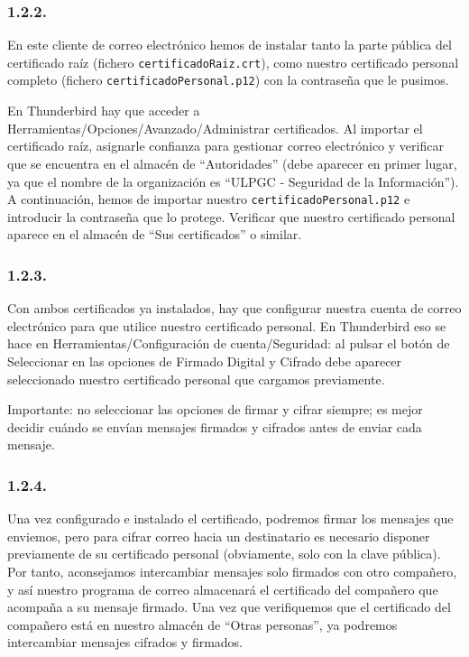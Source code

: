 \subsubsection*{1.2.2.}
En este cliente de correo electrónico hemos de instalar tanto la parte pública del certificado raíz
(fichero \texttt{certificadoRaiz.crt}), como nuestro certificado personal completo
(fichero \texttt{certificadoPersonal.p12}) con la contraseña que le pusimos.

En Thunderbird hay que acceder a Herramientas/Opciones/Avanzado/Administrar certificados. Al importar el
certificado raíz, asignarle confianza para gestionar correo electrónico y verificar que se encuentra en el
almacén de ``Autoridades'' (debe aparecer en primer lugar, ya que el nombre de la organización es
``ULPGC - Seguridad de la Información''). A continuación, hemos de importar nuestro
\texttt{certificadoPersonal.p12} e introducir la contraseña que lo protege. Verificar que nuestro certificado
personal aparece en el almacén de ``Sus certificados'' o similar.

\subsubsection*{1.2.3.}
Con ambos certificados ya instalados, hay que configurar nuestra cuenta de correo electrónico para que utilice
nuestro certificado personal. En Thunderbird eso se hace en Herramientas/Configuración de cuenta/Seguridad:
al pulsar el botón de Seleccionar en las opciones de Firmado Digital y Cifrado debe aparecer seleccionado
nuestro certificado personal que cargamos previamente.

Importante: no seleccionar las opciones de firmar y cifrar siempre; es mejor decidir cuándo se envían mensajes
firmados y cifrados antes de enviar cada mensaje.

\subsubsection*{1.2.4.}
Una vez configurado e instalado el certificado, podremos firmar los mensajes que enviemos, pero para cifrar
correo hacia un destinatario es necesario disponer previamente de su certificado personal (obviamente, solo con
la clave pública). Por tanto, aconsejamos intercambiar mensajes solo firmados con otro compañero, y así nuestro
programa de correo almacenará el certificado del compañero que acompaña a su mensaje firmado. Una vez que
verifiquemos que el certificado del compañero está en nuestro almacén de ``Otras personas'', ya podremos
intercambiar mensajes cifrados y firmados.


